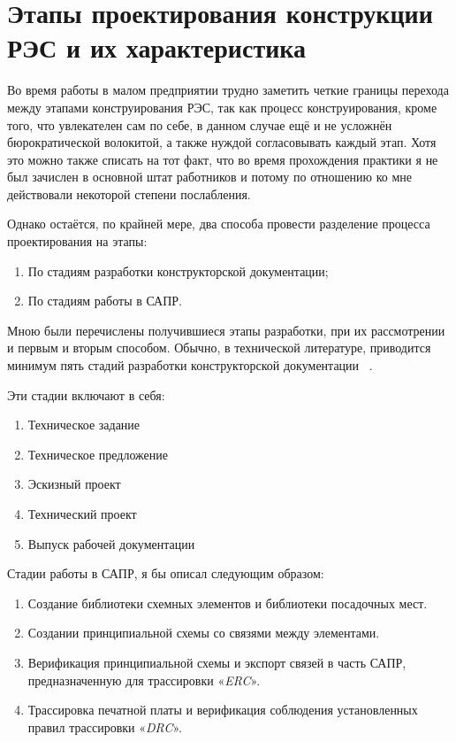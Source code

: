 \section{Этапы проектирования конструкции РЭС и их характеристика}

Во время работы в малом предприятии трудно заметить
четкие границы перехода между этапами конструирования РЭС,
так как процесс конструирования, кроме того, что увлекателен сам по себе,
в данном случае ещё и не усложнён бюрократической волокитой,
а также нуждой согласовывать каждый этап.
Хотя это можно также списать на тот факт,
что во время прохождения практики я не был зачислен в основной штат работников и
потому по отношению ко мне действовали некоторой степени послабления.


Однако остаётся, по крайней мере, два способа
провести разделение процесса проектирования
на этапы:

\begin{enumerate}
\item По стадиям разработки конструкторской документации;
\item По стадиям работы в САПР.
\end{enumerate}

Мною были перечислены получившиеся этапы разработки, при их
рассмотрении и первым и вторым способом. Обычно,
в технической литературе, приводится минимум пять стадий
разработки
конструкторской документации ~\cite{Rotkop1976}.

Эти стадии включают в себя:

\begin{enumerate}
\item Техническое задание
\item Техническое предложение
\item Эскизный проект
\item Технический проект
\item Выпуск рабочей документации
\end{enumerate}


Стадии работы в САПР, я бы описал следующим образом:
\begin{enumerate}
\item Создание библиотеки схемных элементов и библиотеки посадочных мест.
\item Создании принципиальной схемы со связями между элементами.
\item Верификация принципиальной схемы
  и экспорт связей в часть САПР, предназначенную для трассировки
   «\textit{ERC}».
\item Трассировка печатной платы и верификация соблюдения
  установленных правил трассировки
  «\textit{DRC}».
\end{enumerate}


